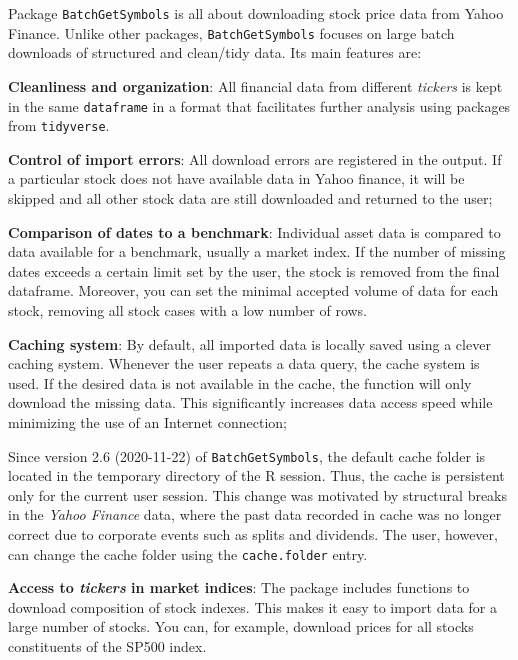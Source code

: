 \documentclass[
  12pt,
]{book}
\newenvironment{rmdimportant}
{\begin{importantblock}
		
	} {\end{importantblock}}
\begin{document}
Package \texttt{BatchGetSymbols} \citep{R-BatchGetSymbols} is all about downloading stock price data from Yahoo Finance. Unlike other packages, \texttt{BatchGetSymbols} focuses on large batch downloads of structured and clean/tidy data. Its main features are: 

\textbf{Cleanliness and organization}: All financial data from different \emph{tickers} is kept in the same \texttt{dataframe} in a format that facilitates further analysis using packages from \texttt{tidyverse}.

\textbf{Control of import errors}: All download errors are registered in the output. If a particular stock does not have available data in Yahoo finance, it will be skipped and all other stock data are still downloaded and returned to the user;

\textbf{Comparison of dates to a benchmark}: Individual asset data is compared to data available for a benchmark, usually a market index. If the number of missing dates exceeds a certain limit set by the user, the stock is removed from the final dataframe. Moreover, you can set the minimal accepted volume of data for each stock, removing all stock cases with a low number of rows.

\textbf{Caching system}: By default, all imported data is locally saved using a clever caching system. Whenever the user repeats a data query, the cache system is used. If the desired data is not available in the cache, the function will only download the missing data. This significantly increases data access speed while minimizing the use of an Internet connection;

\begin{rmdimportant}
Since version 2.6 (2020-11-22) of \texttt{BatchGetSymbols}, the default
cache folder is located in the temporary directory of the R session.
Thus, the cache is persistent only for the current user session. This
change was motivated by structural breaks in the \emph{Yahoo Finance}
data, where the past data recorded in cache was no longer correct due to
corporate events such as splits and dividends. The user, however, can
change the cache folder using the \texttt{cache.folder} entry.
\end{rmdimportant}

\textbf{Access to \emph{tickers} in market indices}: The package includes functions to download composition of stock indexes. This makes it easy to import data for a large number of stocks. You can, for example, download prices for all stocks constituents of the SP500 index.
\end{document}
